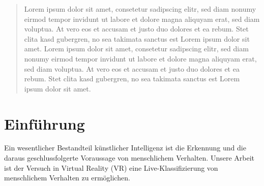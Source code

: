 \begin{abstract}
    Lorem ipsum dolor sit amet, consetetur sadipscing elitr, sed diam nonumy eirmod tempor invidunt ut labore et dolore magna aliquyam erat, sed diam voluptua. At vero eos et accusam et justo duo dolores et ea rebum. Stet clita kasd gubergren, no sea takimata sanctus est Lorem ipsum dolor sit amet. Lorem ipsum dolor sit amet, consetetur sadipscing elitr, sed diam nonumy eirmod tempor invidunt ut labore et dolore magna aliquyam erat, sed diam voluptua. At vero eos et accusam et justo duo dolores et ea rebum. Stet clita kasd gubergren, no sea takimata sanctus est Lorem ipsum dolor sit amet.
\end{abstract}

\section{Einführung}

Ein wesentlicher Bestandteil künstlicher Intelligenz ist die Erkennung und die daraus geschlussfolgerte Voraussage von menschlichem Verhalten. Unsere Arbeit ist der Versuch in Virtual Reality (VR) eine Live-Klassifizierung von menschlichem Verhalten zu ermöglichen.


